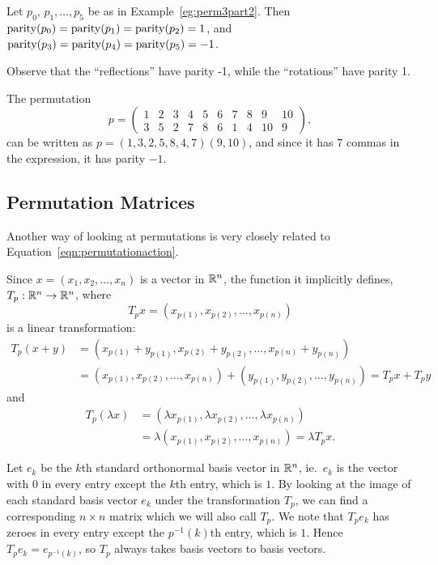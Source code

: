 \begin{example}
  Let $p_{0}$, $p_{1}, \ldots, p_{5}$ be as in Example~\ref{eg:perm3part2}.
  Then $\operatorname{parity}(p_{0}) = \operatorname{parity}(p_{1}) = \operatorname{parity}(p_{2}) = 1$, and
  $\operatorname{parity}(p_{3}) = \operatorname{parity}(p_{4}) = \operatorname{parity}(p_{5}) = -1$.
  
  Observe that the ``reflections'' have parity -1, while the ``rotations''
  have parity 1.
\end{example}

\begin{example}
  The permutation
  \[
    p = \begin{pmatrix}
     1 & 2 & 3 & 4 & 5 & 6 & 7 & 8 & 9 & 10 \\
     3 & 5 & 2 & 7 & 8 & 6 & 1 & 4 & 10 & 9
    \end{pmatrix},
  \]
  can be written as $p = (1, 3, 2, 5, 8, 4, 7)(9, 10)$, and since it has $7$
  commas in the expression, it has parity $-1$.
\end{example}

\subsection{Permutation Matrices}

Another way of looking at permutations is very closely related to
Equation~\ref{eqn:permutationaction}.  

Since $x = (x_{1},x_{2},\ldots,x_{n})$ is a vector in $\mathbb{R}^{n}$, the function
it implicitly defines, $T_{p}: \mathbb{R}^{n} \to \mathbb{R}^{n}$, where
\[
  T_{p}x = (x_{p(1)}, x_{p(2)}, \ldots, x_{p(n)})
\]
is a linear transformation:
\begin{align*}
  T_{p}(x+y) &= (x_{p(1)} + y_{p(1)}, x_{p(2)} + y_{p(2)}, \ldots, x_{p(n)} + y_{p(n)})\\
    &= (x_{p(1)}, x_{p(2)}, \ldots, x_{p(n)}) + (y_{p(1)}, y_{p(2)}, \ldots, y_{p(n)})
    = T_{p}x + T_{p}y
\end{align*}
and
\begin{align*}
  T_{p}(\lambda x) &= (\lambda x_{p(1)}, \lambda x_{p(2)}, \ldots, \lambda x_{p(n)})\\
    &= \lambda (x_{p(1)}, x_{p(2)}, \ldots, x_{p(n)})
    = \lambda T_{p}x.
\end{align*}

Let $e_{k}$ be the $k$th standard orthonormal basis vector in $\mathbb{R}^{n}$,
ie.\ $e_{k}$ is the vector with $0$ in every entry except the $k$th entry,
which is $1$.  By looking at the image of each standard basis vector $e_{k}$
under the transformation $T_{p}$, we can find a corresponding $n \times n$
matrix which we will also call $T_{p}$.
We note that $T_{p}e_{k}$ has zeroes in every entry except the $p^{-1}(k)$th
entry, which is $1$.  Hence $T_{p}e_{k} = e_{p^{-1}(k)}$, so $T_{p}$ always
takes basis vectors to basis vectors.

